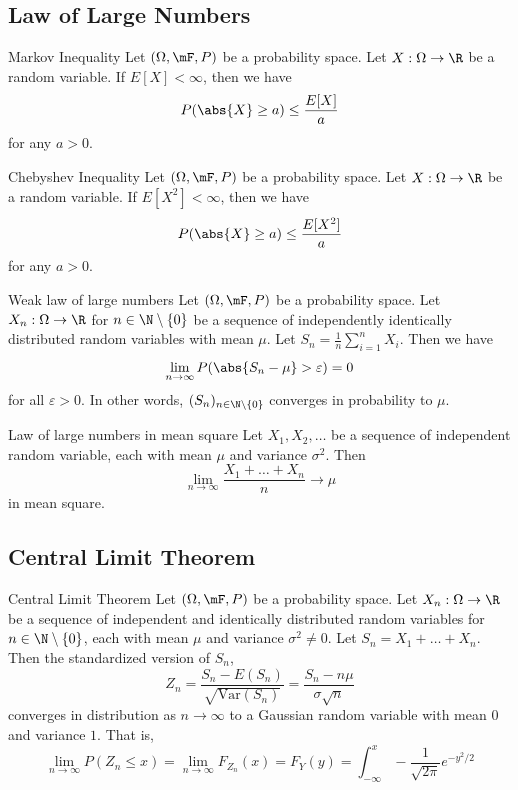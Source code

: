 \documentclass[a4paper]{article}
\begin{document}
\subsection{Law of Large Numbers}
\begin{thm}{Markov Inequality}{} Let $(\Omega,\mF,P)$ be a probability space. Let $X:\Omega\to\R$ be a random variable. If $E[X]<\infty$, then we have $$P(\abs{X}\geq a)\leq\frac{E[X]}{a}$$ for any $a>0$. 
\end{thm}

\begin{thm}{Chebyshev Inequality}{} Let $(\Omega,\mF,P)$ be a probability space. Let $X:\Omega\to\R$ be a random variable. If $E[X^2]<\infty$, then we have $$P(\abs{X}\geq a)\leq\frac{E[X^2]}{a}$$ for any $a>0$. 
\end{thm}

\begin{thm}{Weak law of large numbers}{} Let $(\Omega,\mF,P)$ be a probability space. Let $X_n:\Omega\to\R$ for $n\in\N\setminus\{0\}$ be a sequence of independently identically distributed random variables with mean $\mu$. Let $S_n=\frac{1}{n}\sum_{i=1}^nX_i$. Then we have $$\lim_{n\to\infty}P(\abs{S_n-\mu}>\varepsilon)=0$$ for all $\varepsilon>0$. In other words, $(S_n)_{n\in\N\setminus\{0\}}$ converges in probability to $\mu$. 
\end{thm}

\begin{thm}{Law of large numbers in mean square}{} Let $X_1,X_2,\dots$ be a sequence of independent random variable, each with mean $\mu$ and variance $\sigma^2$. Then $$\lim_{n\to\infty}\frac{X_1+\dots+X_n}{n}\to\mu$$ in mean square. 
\end{thm}

\subsection{Central Limit Theorem}
\begin{thm}{Central Limit Theorem}{} Let $(\Omega,\mF,P)$ be a probability space. Let $X_n:\Omega\to\R$ be a sequence of independent and identically distributed random variables for $n\in\N\setminus\{0\}$, each with mean $\mu$ and variance $\sigma^2\neq 0$. Let $S_n=X_1+\dots+X_n$. Then the standardized version of $S_n$, $$Z_n=\frac{S_n-E(S_n)}{\sqrt{\text{Var}(S_n)}}=\frac{S_n-n\mu}{\sigma\sqrt{n}}$$ converges in distribution as $n\to\infty$ to a Gaussian random variable with mean $0$ and variance $1$. That is, $$\lim_{n\to\infty}P(Z_n\leq x)=\lim_{n\to\infty}F_{Z_n}(x)=F_Y(y)=\int_{-\infty}^{x}-\frac{1}{\sqrt{2\pi}}e^{-y^2/2}$$
\end{thm}
\end{document}
